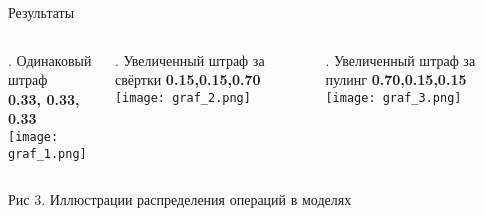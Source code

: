 \documentclass{beamer}
\begin{document}
\begin{frame}[t]{Результаты}
\begin{minipage}[t][0.4\textheight]{\textwidth}  
  \begin{columns}[T, totalwidth=\textwidth]
    \begin{column}{0.3\textwidth}
    . Одинаковый штраф\\
    \textbf{0.33, 0.33, 0.33}\\ 
    \texttt{[image: graf\_1.png]} 
    \end{column}

    \begin{column}{0.3\textwidth}
    . Увеличенный штраф за свёртки
    \textbf{0.15,0.15,0.70}\\
    \texttt{[image: graf\_2.png]}
    \end{column}

    \begin{column}{0.3\textwidth}
    . Увеличенный штраф за пулинг
    \textbf{0.70,0.15,0.15}\\
    \texttt{[image: graf\_3.png]}
    \end{column}
  \end{columns}
\end{minipage}

\begin{minipage}[t][0.35\textheight]{\textwidth} 

  \begin{center}
     Рис 3. Иллюстрации распределения операций в моделях
  \end{center}



\end{minipage}
\end{frame}
\end{document}
